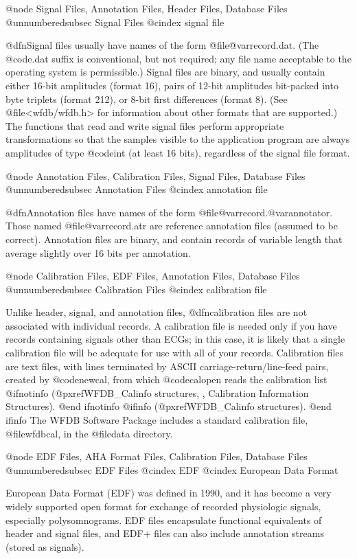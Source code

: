 {{{{{{{{{{{{{{@node     Signal Files, Annotation Files, Header Files, Database Files
@unnumberedsubsec Signal Files
@cindex signal file

@dfn{Signal files} usually have names of the form
@file{@var{record}.dat}.  (The @code{.dat} suffix is conventional, but
not required; any file name acceptable to the operating system is
permissible.)  Signal files are binary, and usually contain either
16-bit amplitudes (format 16), pairs of 12-bit amplitudes bit-packed
into byte triplets (format 212), or 8-bit first differences (format 8).
(See @file{<wfdb/wfdb.h>} for information about other formats that are
supported.)  The functions that read and write signal files perform
appropriate transformations so that the samples visible to the
application program are always amplitudes of type @code{int} (at least
16 bits), regardless of the signal file format.

@node     Annotation Files, Calibration Files, Signal Files, Database Files
@unnumberedsubsec Annotation Files
@cindex annotation file

@dfn{Annotation files} have names of the form
@file{@var{record}.@var{annotator}}.  Those named
@file{@var{record}.atr} are reference annotation files (assumed to be
correct).  Annotation files are binary, and contain records of variable
length that average slightly over 16 bits per annotation.

@node     Calibration Files, EDF Files, Annotation Files, Database Files
@unnumberedsubsec Calibration Files
@cindex calibration file

Unlike header, signal, and annotation files, @dfn{calibration files} are
not associated with individual records.  A calibration file is needed
only if you have records containing signals other than ECGs;  in this
case, it is likely that a single calibration file will be adequate for use
with all of your records.  Calibration files are text files, with lines
terminated by ASCII carriage-return/line-feed pairs, created by
@code{newcal}, from which @code{calopen} reads the calibration list
@ifnotinfo
(@pxref{WFDB_Calinfo structures, , Calibration Information Structures}).
@end ifnotinfo
@ifinfo
(@pxref{WFDB_Calinfo structures}).
@end ifinfo
The WFDB Software Package includes a standard calibration file,
@file{wfdbcal}, in the @file{data} directory.

@node     EDF Files, AHA Format Files, Calibration Files, Database Files
@unnumberedsubsec EDF Files
@cindex EDF
@cindex European Data Format

European Data Format (EDF) was defined in 1990, and it has become a very
widely supported open format for exchange of recorded physiologic signals,
especially polysomnograms. EDF files encapsulate functional equivalents of
header and signal files, and EDF+ files can also include annotation streams
(stored as signals).

}}}}}}}}}}}}}}
